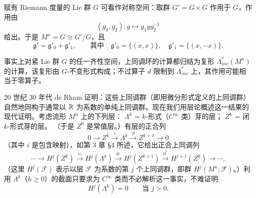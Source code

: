 赋有 Riemann 度量的 Lie 群 $G$ 可看作对称空间：取群 $G'=G\times G$ 作用于 $G$，作用由
\[
  (g_1,g_2):g\longmapsto g_1gg_2^{-1}
\]
给出。于是 $M^n=G\cong G'/G$，且
\begin{equation}
  \mathfrak{g}'=\mathfrak{g}'_0+\mathfrak{g}'_1,\qquad\text{其中}\quad
  \mathfrak{g}'_0=\{(x,x)\},\quad \mathfrak{g}'_1=\{(x,-x)\}. \tag{2.17}
\end{equation}

事实上对紧 Lie 群 $G$ 的任一齐性空间，上同调环的计算都归结为复形 $\Lambda^*_{inv}(M^n)$ 的计算，该复形由 $G$-不变形式构成；不过算子 $d$ 限制到 $\Lambda^*_{inv}$ 上，其作用可能相当于零算子。

20 世纪 30 年代 de Rham 证明：这些上同调群（即用微分形式定义的上同调群）自然地同构于通常以 $\mathbb{R}$ 为系数的单纯上同调群。现在我们用层论概述这一结果的现代证明。考虑流形 $M^n$ 上的下列层：
$\Lambda^k$ = $k$-形式（$C^\infty$ 类）芽的层；
$Z^k$ = 闭 $k$-形式芽的层。
（于是 $Z^0$ 是常值层。）有层的正合列
\begin{equation}
  0\longrightarrow Z^k\stackrel{i}{\longrightarrow}\Lambda^k\stackrel{d}{\longrightarrow}Z^{k+1}\longrightarrow0 \tag{2.18}
\end{equation}
（其中 $i$ 是包含映射），如第 3 章 §4 所述，它给出正合上同调列
\begin{equation}
  \cdots\longrightarrow H^j(Z^k)\stackrel{i_*}{\longrightarrow}H^j(\Lambda^k)
  \stackrel{d_*}{\longrightarrow}H^j(Z^{k+1})\stackrel{\partial^*}{\longrightarrow}
  H^{j+1}(Z^k)\longrightarrow\cdots, \tag{2.19}
\end{equation}
（这里 $H^j(\mathcal F)$ 表示以层 $\mathcal F$ 为系数的第 $j$ 个上同调群，即群 $H^j(M^n;\mathcal F)$。）利用 $\Lambda^k$（$h\ge0$）的截面只要求为 $C^\infty$ 类而不必解析这一事实，不难证明
\begin{equation}
  H^j(\Lambda^k)=0\qquad\text{当 } j>0. \tag{2.20}
\end{equation}

